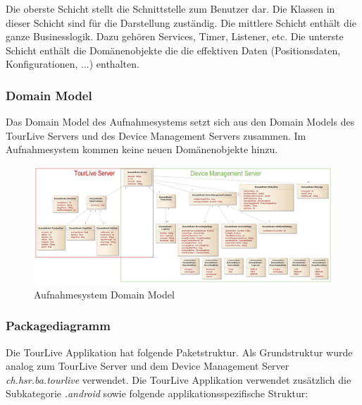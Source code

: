 Die oberste Schicht stellt die Schnittstelle zum Benutzer dar. Die Klassen in dieser Schicht sind für die Darstellung zuständig. Die mittlere Schicht enthält die ganze Businesslogik. Dazu gehören Services, Timer, Listener, etc. Die unterste Schicht enthält die Domänenobjekte die die effektiven Daten (Positionsdaten, Konfigurationen, ...) enthalten. 

\subsubsection{Domain Model}
Das Domain Model des Aufnahmesystems setzt sich aus den Domain Models des TourLive Servers und des Device Management Servers zusammen. Im Aufnahmesystem kommen keine neuen Domänenobjekte hinzu.

\begin{figure}[H]
\centering
\includegraphics[width=130mm]{images/android/domainmodel.jpg}
\caption{Aufnahmesystem Domain Model}
\end{figure}

\subsubsection{Packagediagramm}
Die TourLive Applikation hat folgende Paketstruktur. Als Grundstruktur wurde analog zum TourLive Server und dem Device Management Server \textit{ch.hsr.ba.tourlive} verwendet. Die TourLive Applikation verwendet zusätzlich die Subkategorie \textit{.android} sowie folgende applikationsspezifische Struktur:

